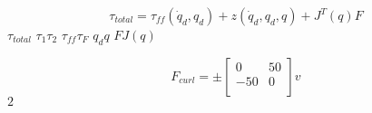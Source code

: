\documentclass[fleqn]{article}
\begin{document}
\setlength{\mathindent}{-3cm}
\begin{equation}
\tau_{total} = \tau_{ff}(\dot{q}_d,q_d)+z(\dot{q}_d,q_d,q)+J^T(q)F
\end{equation}
$\tau_{total}$ \linebreak \linebreak
$\tau_1 \tau_2$ \linebreak \linebreak
$\tau_{ff} \tau_F$ \linebreak \linebreak
$q_d q$ \linebreak \linebreak
$F J(q)$ \linebreak \linebreak

\begin{equation}
F_{curl}=\pm \left[ \begin{array}{cc}
0 & 50 \\
-50 & 0 \\
\end{array}
\right]v
\end{equation}
$2$
\end{document}
